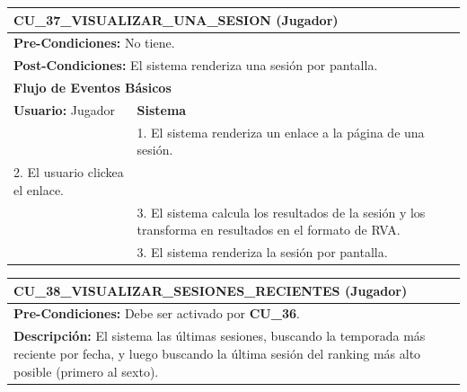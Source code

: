 \begin{center}
  \begin{tabular}{| p{7.5cm} | p{7.5cm} |}
    \hline
    \multicolumn{2}{|p{15cm}|}{\textbf{CU\_37\_VISUALIZAR\_UNA\_SESION} (Jugador)} \\ \hline
    \multicolumn{2}{|p{15cm}|}{\textbf{Pre-Condiciones:} No tiene.} \\ \hline
    \multicolumn{2}{|p{15cm}|}{\textbf{Post-Condiciones:} El sistema renderiza una sesión por pantalla.} \\ \hline
    \multicolumn{2}{|p{7.5cm}|}{\textbf{Flujo de Eventos Básicos}} \\ \hline
    \multicolumn{1}{|p{7.5cm}|}{\textbf{Usuario:} Jugador} & \multicolumn{1}{|p{7.5cm}|}{\textbf{Sistema}} \\ \hline
    
    \multicolumn{1}{|p{7.5cm}|}{} & 
    \multicolumn{1}{|p{7.5cm}|}{1. El sistema renderiza un enlace a la página de una sesión.}\\ \hline
    
    \multicolumn{1}{|p{7.5cm}|}{2. El usuario clickea el enlace.}& 
    \multicolumn{1}{|p{7.5cm}|}{}\\ \hline
    
    \multicolumn{1}{|p{7.5cm}|}{} & 
    \multicolumn{1}{|p{7.5cm}|}{3. El sistema calcula los resultados de la sesión y los transforma en resultados en el formato de RVA.}\\ \hline
    
    \multicolumn{1}{|p{7.5cm}|}{} & 
    \multicolumn{1}{|p{7.5cm}|}{3. El sistema renderiza la sesión por pantalla.}\\ \hline
  \end{tabular}
\end{center}

\begin{center}
  \begin{tabular}{| p{7.5cm} | p{7.5cm} |}
    \hline
    \multicolumn{2}{|p{15cm}|}{\textbf{CU\_38\_VISUALIZAR\_SESIONES\_RECIENTES} (Jugador)} \\ \hline
    \multicolumn{2}{|p{15cm}|}{\textbf{Pre-Condiciones:} Debe ser activado por \textbf{CU\_36}.} \\ \hline
    \multicolumn{2}{|p{15cm}|}{\textbf{Descripción:} El sistema las últimas sesiones, buscando la temporada más reciente por fecha, y luego buscando la última sesión del ranking más alto posible (primero al sexto).} \\
    \hline
  \end{tabular}
\end{center}



